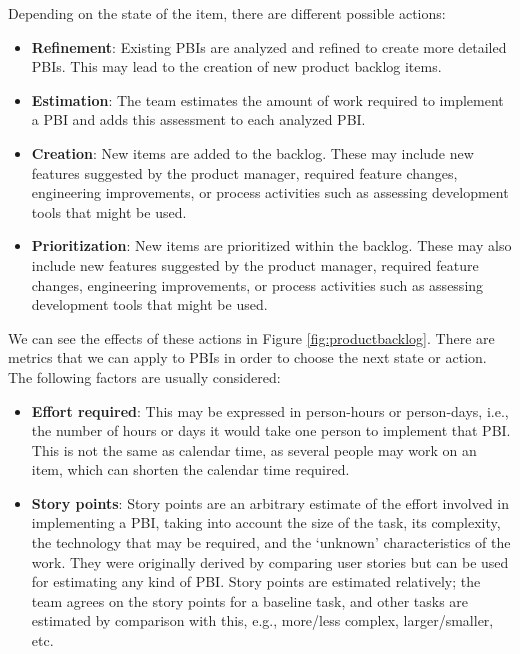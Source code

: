 Depending on the state of the item, there are different possible actions:

\begin{itemize}
	\item \textbf{Refinement}: Existing PBIs are analyzed and refined to create more detailed PBIs. This may lead to the creation of new product backlog items.
	\item \textbf{Estimation}: The team estimates the amount of work required to implement a PBI and adds this assessment to each analyzed PBI.
	\item \textbf{Creation}: New items are added to the backlog. These may include new features suggested by the product manager, required feature changes, engineering improvements, or process activities such as assessing development tools that might be used.
    \item \textbf{Prioritization}: New items are prioritized within the backlog. These may also include new features suggested by the product manager, required feature changes, engineering improvements, or process activities such as assessing development tools that might be used.
\end{itemize}

We can see the effects of these actions in Figure \ref{fig:productbacklog}. There are metrics that we can apply to PBIs in order to choose the next state or action. The following factors are usually considered:

\begin{itemize}
\item \textbf{Effort required}: This may be expressed in person-hours or person-days, i.e., the number of hours or days it would take one person to implement that PBI. This is not the same as calendar time, as several people may work on an item, which can shorten the calendar time required.
\item \textbf{Story points}: Story points are an arbitrary estimate of the effort involved in implementing a PBI, taking into account the size of the task, its complexity, the technology that may be required, and the ‘unknown’ characteristics of the work. They were originally derived by comparing user stories but can be used for estimating any kind of PBI. Story points are estimated relatively; the team agrees on the story points for a baseline task, and other tasks are estimated by comparison with this, e.g., more/less complex, larger/smaller, etc.
\end{itemize}
